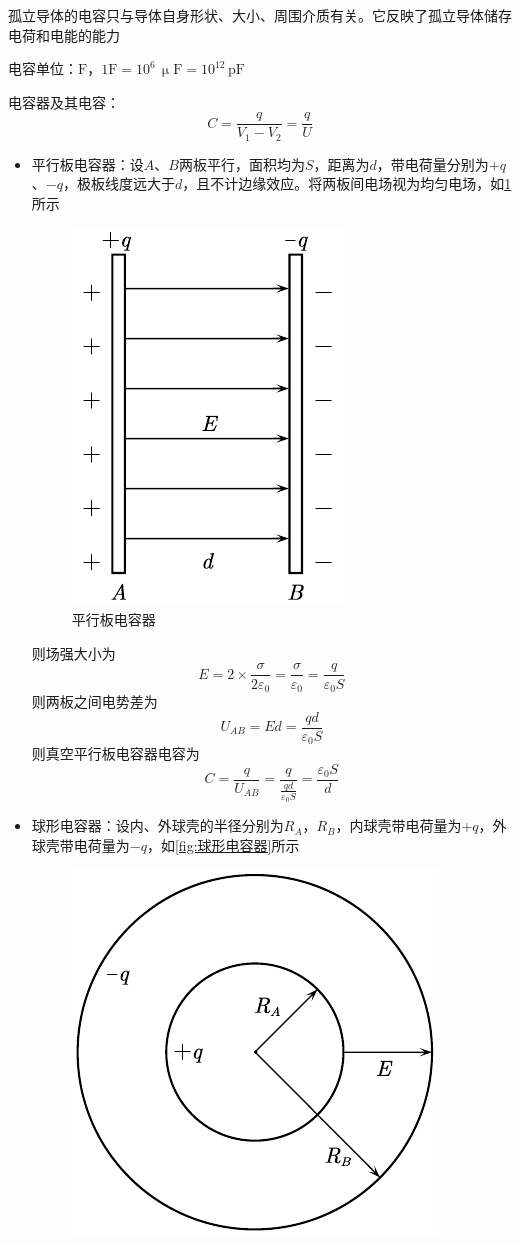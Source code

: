 \documentclass[12pt, a4paper, twoside]{ctexbook}
\begin{document}
孤立导体的电容只与导体自身形状、大小、周围介质有关。它反映了孤立导体储存电荷和电能的能力

{\sonti 电容单位}：$\mathrm{F}$，$1\mathrm{F}=10^6\,\upmu\mathrm{F}=10^{12}\,\mathrm{pF}$

{\sonti 电容器及其电容}：
$$
C=\frac{q}{V_1-V_2}=\frac{q}{U}
$$
\begin{itemize}
    \item {\sonti 平行板电容器}：设$A$、$B$两板平行，面积均为$S$，距离为$d$，带电荷量分别为$+q$、$-q$，极板线度远大于$d$，且不计边缘效应。将两板间电场视为均匀电场，如\textcolor{blue}{\cref{fig:平行板电容器}}所示
    \begin{figure}[H]
        \centerline{\includegraphics[scale=0.8]{平行板电容器.pdf}}
        \caption{平行板电容器}\label{fig:平行板电容器}
    \end{figure}
    则场强大小为
    $$
    E=2\times\frac{\sigma}{2\varepsilon_0}=\frac{\sigma}{\varepsilon_0}=\frac{q}{\varepsilon_0S}
    $$
    则两板之间电势差为
    $$
    U_{AB}=Ed=\frac{qd}{\varepsilon_0S}
    $$
    则真空平行板电容器电容为
    $$
    C=\frac{q}{U_{AB}}=\frac{q}{\frac{qd}{\varepsilon_0S}}=\frac{\varepsilon_0S}{d}
    $$
    \item {\sonti 球形电容器}：设内、外球壳的半径分别为$R_A$，$R_B$，内球壳带电荷量为$+q$，外球壳带电荷量为$-q$，如\textcolor{blue}{\cref{fig:球形电容器}}所示
    \begin{figure}[H]
        \centerline{\includegraphics[scale=0.8]{球形电容器.pdf}}

\end{figure}
\end{itemize}
\end{document}
